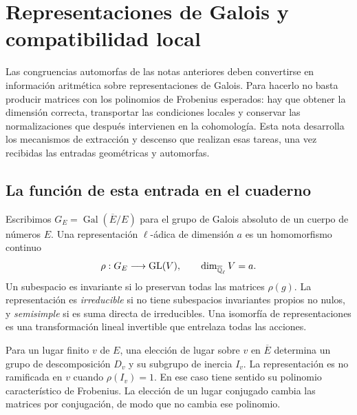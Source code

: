 \section{Representaciones de Galois y compatibilidad local}
\label{sec:galois}

Las congruencias automorfas de las notas anteriores deben convertirse en
información aritmética sobre representaciones de Galois. Para hacerlo
no basta producir matrices con los polinomios de Frobenius esperados:
hay que obtener la dimensión correcta, transportar las condiciones
locales y conservar las normalizaciones que después intervienen en la
cohomología. Esta nota desarrolla los mecanismos de extracción y
descenso que realizan esas tareas, una vez recibidas las entradas
geométricas y automorfas.


\subsection{La función de esta entrada en el cuaderno}

Escribimos $G_E=\operatorname{Gal}(\overline E/E)$ para el grupo de
Galois absoluto de un cuerpo de números $E$. Una representación
$\ell$-ádica de dimensión $a$ es un homomorfismo continuo
\[
 \rho:G_E\longrightarrow
       \operatorname{GL}(V),\qquad
 \dim_{\overline{\mathbb{Q}}_\ell}V=a.
\]
Un subespacio es invariante si lo preservan todas las matrices
$\rho(g)$. La representación es \emph{irreducible} si no tiene
subespacios invariantes propios no nulos, y \emph{semisimple} si
es suma directa de irreducibles. Una isomorfía de representaciones
es una transformación lineal invertible que entrelaza todas
las acciones.

Para un lugar finito $v$ de $E$, una elección de lugar sobre $v$
en $\overline E$ determina un grupo de descomposición $D_v$ y su
subgrupo de inercia $I_v$. La representación es no ramificada
en $v$ cuando $\rho(I_v)=1$. En ese caso tiene sentido su polinomio
característico de Frobenius. La elección de un lugar conjugado
cambia las matrices por conjugación, de modo que no cambia ese
polinomio.

